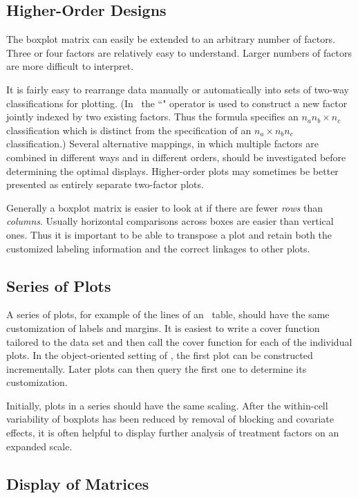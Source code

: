 \subsection{Higher-Order Designs}

The boxplot matrix can easily be extended to an arbitrary number
of factors.  Three or four factors are relatively easy to
understand.  Larger numbers of factors are more difficult to
interpret.

It is fairly easy to rearrange data manually or automatically
into sets of two-way classifications for plotting.  (In \iS\
the ``\s{:}" operator is used to construct a new factor jointly
indexed by two existing factors.  Thus the formula 
specifies an
$n_a n_b \times n_c$ classification which is distinct from the
 specification of an $n_a \times n_b n_c$
classification.)  Several
alternative mappings, in which	multiple factors are combined
in different ways and in different orders, should be investigated
before determining the optimal displays.
Higher-order plots may sometimes be better presented as entirely
separate two-factor plots.

Generally a boxplot matrix is easier to look at if there
are fewer {\it rows} than {\it columns}.
Usually horizontal comparisons across boxes are easier than
vertical ones.	Thus it is important to be able to transpose a
plot and retain both the customized labeling information and the
correct linkages to other plots.


\subsection{Series of Plots}

A series of plots, for example of the lines of an \ANOVA\ table,
should have the same customization of labels and margins.  It is
easiest to write a cover function tailored to the data set and
then call the cover function for each of the individual plots.
In the object-oriented setting of \iX, the first plot can be
constructed
incrementally.	Later plots can then query the first one to
determine its customization.

Initially, plots in a series should have the same scaling.  After
the within-cell variability of boxplots has been reduced by
removal of blocking and covariate effects, it is often helpful to
display further analysis of treatment factors on an expanded
scale.


\subsection{Display of Matrices}
\label{sec.disp.mat}

